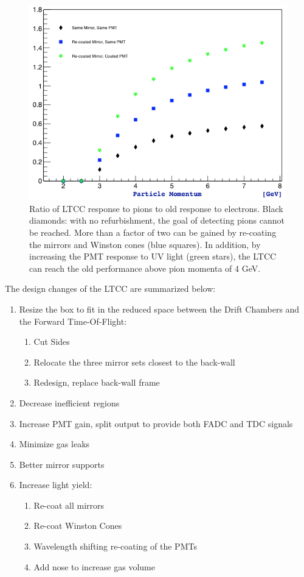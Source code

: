 \begin{figure}
	\centering
	\includegraphics[width=0.99\columnwidth, height=0.7\columnwidth]{img/refurbishmentGains.png}
	\caption{Ratio of LTCC response to pions to old response to electrons. Black diamonds: with no refurbishment, the goal of detecting pions cannot be reached.
            More than a factor of two can be gained by re-coating the mirrors and Winston cones (blue squares). In addition, by increasing the
            PMT response to UV light (green stars), the LTCC can reach the old performance above pion momenta of 4 GeV.}
	\label{fig:refurbishmentGains}
\end{figure}

The design changes of the LTCC are summarized below:

\begin{enumerate}
\item Resize the box to fit in the reduced space between the Drift Chambers and the Forward Time-Of-Flight:
	\begin{enumerate}
		\item Cut Sides
		\item Relocate the three mirror sets closest to the back-wall
		\item Redesign, replace back-wall frame
	\end{enumerate}

	\item Decrease inefficient regions
	\item Increase PMT gain, split output to provide both FADC and TDC signals
	\item Minimize gas leaks
	\item Better mirror supports
	\item Increase light yield:
	\begin{enumerate}
		\item Re-coat all mirrors
		\item Re-coat Winston Cones
		\item Wavelength shifting re-coating of the PMTs
		\item Add nose to increase gas volume
	\end{enumerate}
\end{enumerate}








